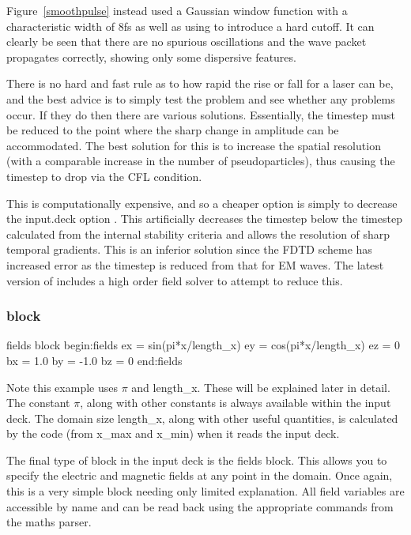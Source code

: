 Figure~\ref{smoothpulse} instead used a Gaussian window function with a
characteristic width of 8fs as well as using  to introduce
a hard cutoff. It can clearly be seen that there are no spurious oscillations
and the wave packet propagates correctly, showing only some dispersive
features.

There is no hard and fast rule as to how rapid the rise or fall for a laser can
be, and the best advice is to simply test the problem and see whether any
problems occur. If they do then there are various solutions. Essentially, the
timestep must be reduced to the point where the sharp change in amplitude can
be accommodated. The best solution for this is to increase the spatial
resolution (with a comparable increase in the number of pseudoparticles), thus
causing the timestep to drop via the CFL condition.

This is computationally expensive, and so a cheaper option is simply to
decrease the input.deck option . This artificially
decreases the timestep below the timestep calculated from the internal
stability criteria and allows the resolution of sharp temporal gradients. This
is an inferior solution since the FDTD scheme has increased error as the
timestep is reduced from that for EM waves. The latest version of {\EPOCH}
includes a high order field solver to attempt to reduce this.

\subsubsection{ block}
\begin{lboxverbatim}{fields block}
begin:fields
   ex = sin(pi*x/length_x)
   ey = cos(pi*x/length_x)
   ez = 0
   bx = 1.0
   by = -1.0
   bz = 0
end:fields
\end{lboxverbatim}

Note this example uses $\pi$ and length\_x. These will be explained later in
detail. The constant $\pi$, along with other constants is always available
within the input deck. The domain size length\_x, along with other useful
quantities, is calculated by the code (from x\_max and x\_min)
when it reads the input deck.

The final type of block in the {\EPOCH} input deck is the fields block. This
allows you to specify the electric and magnetic fields at any point in the
domain. Once again, this is a very simple block needing only limited
explanation. All field variables are accessible by name and can be read back
using the appropriate commands from the maths parser. \\

